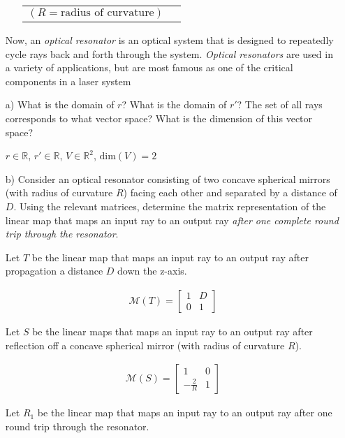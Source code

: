 \documentclass[fleqn]{article}
\begin{document}
\begin{enumerate}[nolistsep]
\begin{itemize}
					\begin{tabularx}{0.85\textwidth}{>{\hsize=0.75\hsize}X  >{\hsize=0.25\hsize}X}
						$(R = \text{radius of curvature})$ &\\						
					\end{tabularx}
			\end{itemize}
			\endgroup
				
			Now, an \textit{optical resonator} is an optical system that is designed to repeatedly cycle rays back and forth through the system. \textit{Optical resonators} are used in a variety of applications, but are most famous as one of the critical components in a laser system
			
			\item[a)] What is the domain of $r$? What is the domain of $r'$? The set of all rays corresponds to what vector space? What is the dimension of this vector space?
			
			$r \in \mathbb{R}$, $r' \in \mathbb{R}$, $V \in \mathbb{R}^2$, $\text{dim}(V) = 2$
			
			\item[b)] Consider an optical resonator consisting of two concave spherical mirrors (with radius of curvature $R$) facing each other and separated by a distance of $D$. Using the relevant matrices, determine the matrix representation of the linear map that maps an input ray to an output ray \textit{after one complete round trip through the resonator}.
			
			Let $T$ be the linear map that maps an input ray to an output ray after propagation a distance $D$ down the z-axis.
			
			\begin{align*}
				\mathcal{M}(T) = \begin{bmatrix}1 & D\\ 0 & 1\end{bmatrix}
			\end{align*}
			
			Let $S$ be the linear maps that maps an input ray to an output ray after reflection off a concave spherical mirror (with radius of curvature $R$).
			
			\begin{align*}
				\mathcal{M}(S) = \begin{bmatrix} 1 & 0\\ -\frac{2}{R} & 1 \end{bmatrix}
			\end{align*}
			
			Let $R_1$ be the linear map that maps an input ray to an output ray after one round trip through the resonator.
			

\end{enumerate}
\end{document}
